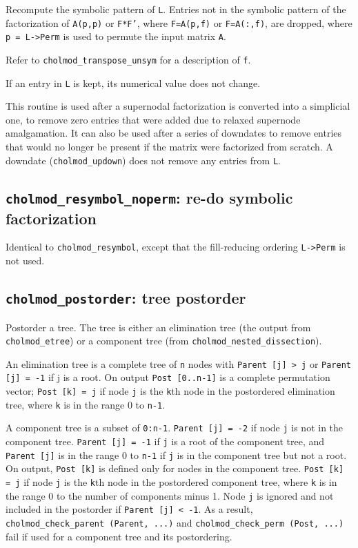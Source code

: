 \documentclass[11pt]{article}
\begin{document}

Recompute the symbolic pattern of {\tt L}.  Entries not in the symbolic pattern
of the factorization of {\tt A(p,p)} or {\tt F*F'}, where
{\tt F=A(p,f)} or {\tt F=A(:,f)}, are dropped, where
{\tt p = L->Perm} is used to permute the input matrix {\tt A}.

Refer to {\tt cholmod\_transpose\_unsym} for a description of {\tt f}.

If an entry in {\tt L} is kept, its numerical value does not change.

This routine is used after a supernodal factorization is converted into
a simplicial one, to remove zero entries that were added due to relaxed
supernode amalgamation.  It can also be used after a series of downdates
to remove entries that would no longer be present if the matrix were
factorized from scratch.  A downdate ({\tt cholmod\_updown}) does not remove any
entries from {\tt L}.

\subsection{{\tt cholmod\_resymbol\_noperm}: re-do symbolic factorization}


Identical to {\tt cholmod\_resymbol}, except that the fill-reducing
ordering {\tt L->Perm} is not used.

\newpage \subsection{{\tt cholmod\_postorder}: tree postorder}


Postorder a tree.  The tree is either an elimination tree (the output from
{\tt cholmod\_etree}) or a component tree (from {\tt cholmod\_nested\_dissection}).

An elimination tree is a complete tree of {\tt n} nodes with {\tt Parent [j] > j} or
{\tt Parent [j] = -1} if j is a root.  On output {\tt Post [0..n-1]} is a complete
permutation vector;
{\tt Post [k] = j} if node {\tt j} is the {\tt k}th node in the
postordered elimination tree, where {\tt k} is in the range 0 to {\tt n-1}.

A component tree is a subset of {\tt 0:n-1}.  {\tt Parent [j] = -2} if node {\tt j} is not
in the component tree.  {\tt Parent [j] = -1} if {\tt j} is a root of the component
tree, and {\tt Parent [j]} is in the range 0 to {\tt n-1} if {\tt j} is in the component
tree but not a root.  On output, {\tt Post [k]} is defined only for nodes in
the component tree.  {\tt Post [k] = j} if node {\tt j} is the {\tt k}th node in the
postordered component tree, where {\tt k} is in the range 0 to the number of
components minus 1.
Node {\tt j} is ignored and not included in the postorder if {\tt Parent [j] < -1}.
As a result, {\tt cholmod\_check\_parent (Parent, ...)} and {\tt cholmod\_check\_perm (Post, ...)}
fail if used for a component tree and its postordering.
\end{document}
